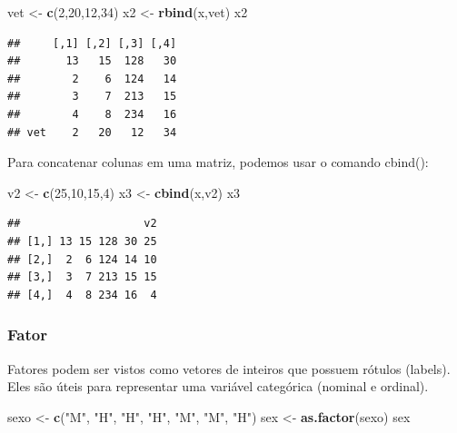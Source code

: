 \documentclass[
]{book}
\newenvironment{Shaded}{\begin{snugshade}}{\end{snugshade}}
\newcommand{\DecValTok}[1]{\textcolor[rgb]{0.00,0.00,0.81}{#1}}
\newcommand{\KeywordTok}[1]{\textcolor[rgb]{0.13,0.29,0.53}{\textbf{#1}}}
\newcommand{\NormalTok}[1]{#1}
\newcommand{\StringTok}[1]{\textcolor[rgb]{0.31,0.60,0.02}{#1}}
\begin{document}
\begin{Shaded}
\begin{Highlighting}[]
\NormalTok{vet <-}\StringTok{ }\KeywordTok{c}\NormalTok{(}\DecValTok{2}\NormalTok{,}\DecValTok{20}\NormalTok{,}\DecValTok{12}\NormalTok{,}\DecValTok{34}\NormalTok{)}
\NormalTok{x2 <-}\StringTok{ }\KeywordTok{rbind}\NormalTok{(x,vet)}
\NormalTok{x2}
\end{Highlighting}
\end{Shaded}

\begin{verbatim}
##     [,1] [,2] [,3] [,4]
##       13   15  128   30
##        2    6  124   14
##        3    7  213   15
##        4    8  234   16
## vet    2   20   12   34
\end{verbatim}

Para concatenar colunas em uma matriz, podemos usar o comando cbind():

\begin{Shaded}
\begin{Highlighting}[]
\NormalTok{v2 <-}\StringTok{ }\KeywordTok{c}\NormalTok{(}\DecValTok{25}\NormalTok{,}\DecValTok{10}\NormalTok{,}\DecValTok{15}\NormalTok{,}\DecValTok{4}\NormalTok{) }
\NormalTok{x3 <-}\StringTok{ }\KeywordTok{cbind}\NormalTok{(x,v2)}
\NormalTok{x3}
\end{Highlighting}
\end{Shaded}

\begin{verbatim}
##                   v2
## [1,] 13 15 128 30 25
## [2,]  2  6 124 14 10
## [3,]  3  7 213 15 15
## [4,]  4  8 234 16  4
\end{verbatim}

\hypertarget{fator}{%
\subsubsection{Fator}\label{fator}}

Fatores podem ser vistos como vetores de inteiros que possuem rótulos (labels). Eles são úteis para representar uma variável categórica (nominal e ordinal).

\begin{Shaded}
\begin{Highlighting}[]
\NormalTok{sexo <-}\StringTok{ }\KeywordTok{c}\NormalTok{(}\StringTok{"M"}\NormalTok{, }\StringTok{"H"}\NormalTok{, }\StringTok{"H"}\NormalTok{, }\StringTok{"H"}\NormalTok{, }\StringTok{"M"}\NormalTok{, }\StringTok{"M"}\NormalTok{, }\StringTok{"H"}\NormalTok{)}
\NormalTok{sex <-}\StringTok{ }\KeywordTok{as.factor}\NormalTok{(sexo)}
\NormalTok{sex}
\end{Highlighting}
\end{Shaded}
\end{document}
